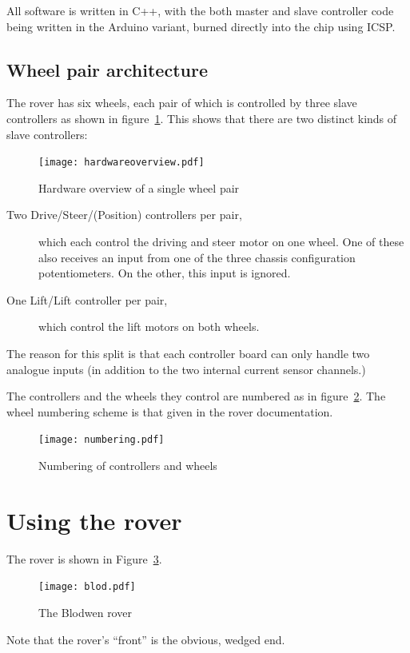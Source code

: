 All software is written in C++, with the both master and slave controller
code being written in the Arduino variant, burned directly into the chip
using ICSP.

\subsection{Wheel pair architecture}
\label{whpairarc}
The rover has six wheels, each pair of which is controlled by three
slave controllers as shown in figure~\ref{fig2}.
This shows that there are two distinct kinds of slave controllers:


\begin{figure}[ht]
\center
\texttt{[image: hardwareoverview.pdf]}
\caption{Hardware overview of a single wheel pair}
\label{fig2}
\end{figure}

\begin{description}
\item [Two Drive/Steer/(Position) controllers per pair,] which each control the driving
and steer motor on one wheel. One of these also receives an input from
one of the three chassis configuration potentiometers. On the other, this
input is ignored.
\item [One Lift/Lift controller per pair,] which control the lift motors on both wheels.
\end{description}
The reason for this split is that each controller board can only handle 
two analogue inputs (in addition to the two internal current sensor channels.)

The controllers and the wheels they control are numbered as in figure~\ref{fig3}.
The wheel numbering scheme is that given in the rover documentation.

\begin{figure}[ht]
\center
\texttt{[image: numbering.pdf]}
\caption{Numbering of controllers and wheels}
\label{fig3}
\end{figure}

\clearpage
\section{Using the rover}
The rover is shown in Figure~\ref{fig:blod}. 
\begin{figure}[ht]
\center
\texttt{[image: blod.pdf]}
\caption{The Blodwen rover}
\label{fig:blod}
\end{figure}
Note that the rover's ``front'' is the obvious, wedged end.


